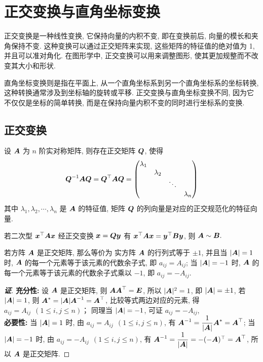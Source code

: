 \section{正交变换与直角坐标变换}

正交变换是一种线性变换, 它保持向量的内积不变, 即在变换前后, 向量的模长和夹角保持不变. 这种变换可以通过正交矩阵来实现, 这些矩阵的特征值的绝对值为 1, 并且可以准对角化. 在图形学中, 正交变换可以用来调整图形, 使其更加规整而不改变其大小和形状.

直角坐标变换则是指在平面上, 从一个直角坐标系到另一个直角坐标系的坐标转换, 这种转换通常涉及到坐标轴的旋转或平移. 正交变换与直角坐标变换不同, 因为它不仅仅是坐标的简单转换, 而是在保持向量内积不变的同时进行坐标系的变换.

\subsection{正交变换}

\begin{definition}[正交矩阵]
    设 $\vb*{A}$ 为 $n$ 阶实对称矩阵, 则存在正交矩阵 $\vb*{Q}$, 使得
    $$\vb*{Q}^{-1}\vb*{AQ}=\vb*{Q}^\top\vb*{AQ}=\mqty(\dmat{\lambda_1,\lambda_2,\ddots,\lambda_n})$$
    其中 $\lambda_1,\lambda_2,\cdots,\lambda_n$ 是 $\vb*{A}$ 的特征值, 矩阵 $\vb*{Q}$ 的列向量是对应的正交规范化的特征向量.
\end{definition}

\begin{theorem}[正交变换与相似]
    若二次型 $\vb*{x}^\top\vb*{Ax}$ 经正交变换 $\vb*{x}=\vb*{Qy}$ 有 $\vb*{x}^\top\vb*{Ax}=\vb*{y}^\top\vb*{By}$, 则 $\vb*{A}\sim\vb*{B}.$
\end{theorem}

\begin{theorem}[正交矩阵的行列式]
    若方阵 $\vb*{A}$ 是正交矩阵, 那么等价为 实方阵 $\vb*{A}$ 的行列式等于 $\pm1$, 并且当 $|\vb*{A}|=1$ 时, $\vb*{A}$ 的每一个元素等于该元素的代数余子式, 即 $a_{ij}=A_{ij}$;
    当 $|\vb*{A}|=-1$ 时, $\vb*{A}$ 的每一个元素等于该元素的代数余子式乘以 $-1$, 即 $a_{ij}=-A_{ij}.$
\end{theorem}
\begin{proof}[{\songti \textbf{证}}]
    \textbf{充分性: }设 $\vb*{A}$ 是正交矩阵, 则 $\vb*{AA}^\top=\vb*{E}$, 所以 $|\vb*{A}|^2=1$, 即 $|\vb*{A}|=\pm1$, 若 $|\vb*{A}|=1$, 则 $\vb*{A}^*=|\vb*{A}|\vb*{A}^{-1}=\vb*{A}^\top$, 比较等式两边对应的元素, 得 $a_{ij}=A_{ij}~~(1\leqslant i,j\leqslant n)$；
    同理当 $|\vb*{A}|=-1$, 可证 $a_{ij}=-A_{ij}$, \\
    \textbf{必要性: }当 $|\vb*{A}|=1$ 时, 由 $a_{ij}=A_{ij}~~(1\leqslant i,j\leqslant n)$, 有 $\vb*{A}^{-1}=\dfrac{1}{|\vb*{A}|}\vb*{A}^*=\vb*{A}^\top$; 当 $|\vb*{A}|=-1$ 时, 由 $a_{ij}=-A_{ij}~~(1\leqslant i,j\leqslant n)$, 有 $\vb*{A}^{-1}=\dfrac{1}{|\vb*{A}|}=-(-\vb*{A})^\top=\vb*{A}^\top$, 所以 $\vb*{A}$ 是正交矩阵.
\end{proof}


